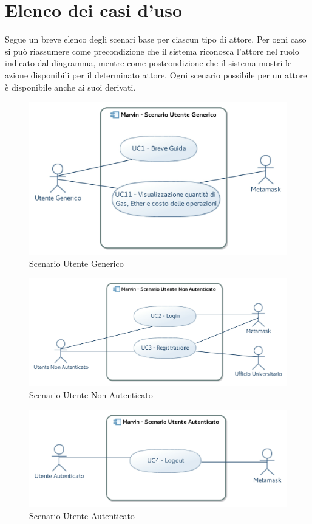 \documentclass[AnalisiDeiRequisiti.tex]{subfiles}
\begin{document}
\section{Elenco dei casi d'uso}
Segue un breve elenco degli scenari base per ciascun tipo di attore. Per ogni caso si può riassumere come precondizione che il sistema riconosca l'attore nel ruolo indicato dal diagramma, mentre come postcondizione che il sistema mostri le azione disponibili per il determinato attore.
Ogni scenario possibile per un attore è disponibile anche ai suoi derivati.
\begin{figure}[H]
	\centering
	\includegraphics[width=1.0\linewidth]{UC01.jpg}
	\caption{Scenario Utente Generico}
	\label{fig:Scenario Utente Generico}
\end{figure}
\begin{figure}[H]
	\centering
	\includegraphics[width=1.0\linewidth]{UC02.jpg}
	\caption{Scenario Utente Non Autenticato}
	\label{fig:Scenario Utente Non Autenticato}
\end{figure}
\begin{figure}[H]
	\centering
	\includegraphics[width=1.0\linewidth]{UC03.jpg}
	\caption{Scenario Utente Autenticato}
	\label{fig:Scenario Utente Autenticato}
\end{figure}
\end{document}
